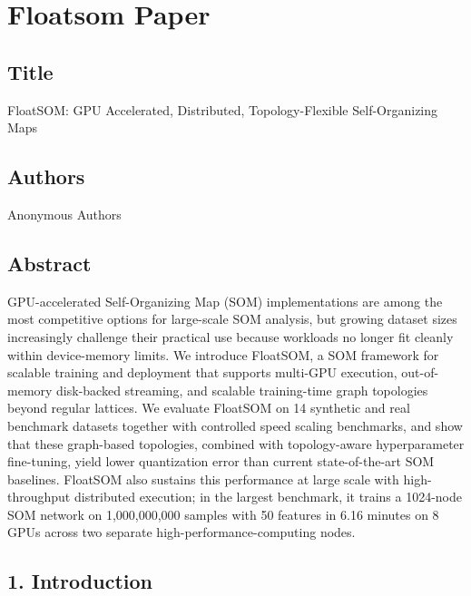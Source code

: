 \documentclass[
]{article}
\author{}
\date{}
\providecommand{\DIFadd}[1]{{\protect\color{blue} #1}} %
\providecommand{\DIFaddbegin}{} %
\providecommand{\DIFaddend}{} %
\begin{document}
\section{Floatsom Paper}\label{floatsom-paper}

\subsection{Title}\label{title}

FloatSOM: GPU Accelerated, Distributed, Topology-Flexible
Self-Organizing Maps

\subsection{Authors}\label{authors}

Anonymous Authors

\subsection{Abstract}\label{abstract}

GPU-accelerated Self-Organizing Map (SOM) implementations are among the
most competitive options for large-scale SOM analysis, but growing
dataset sizes increasingly challenge their practical use because
workloads no longer fit cleanly within device-memory limits. We
introduce FloatSOM, a SOM framework for scalable training and deployment
that supports multi-GPU execution, out-of-memory disk-backed streaming,
and  \DIFaddbegin \DIFadd{scalable training-time graph }\DIFaddend topologies beyond regular lattices. We
evaluate FloatSOM on 14 synthetic and real benchmark datasets together
with controlled speed scaling benchmarks, and show that these
 \DIFaddbegin \DIFadd{graph-based }\DIFaddend topologies, combined with topology-aware hyperparameter
fine-tuning, yield lower quantization error than current
state-of-the-art SOM baselines. FloatSOM also sustains this performance
at large scale with high-throughput distributed execution; in the
largest benchmark, it trains a 1024-node SOM network on 1,000,000,000
samples with 50 features in 6.16 minutes on 8 GPUs across two separate
high-performance-computing nodes.

\subsection{1. Introduction}\label{introduction}
\end{document}
